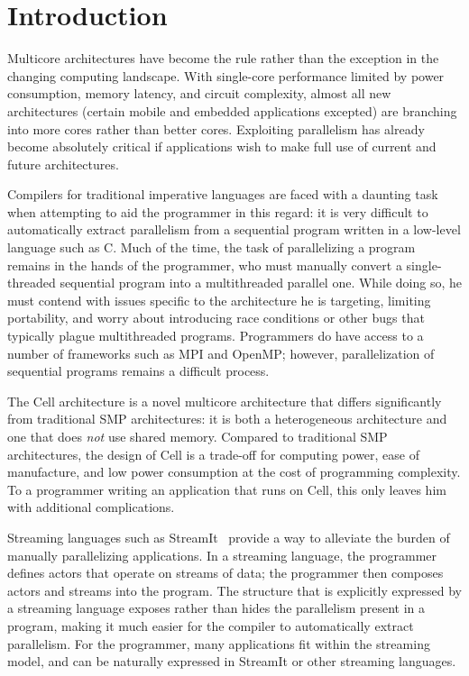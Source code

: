 \section{Introduction}

Multicore architectures have become the rule rather than the exception in the changing computing landscape. With single-core performance limited by power consumption, memory latency, and circuit complexity, almost all new architectures (certain mobile and embedded applications excepted) are branching into more cores rather than better cores. Exploiting parallelism has already become absolutely critical if applications wish to make full use of current and future architectures.

Compilers for traditional imperative languages are faced with a daunting task when attempting to aid the programmer in this regard: it is very difficult to automatically extract parallelism from a sequential program written in a low-level language such as C. Much of the time, the task of parallelizing a program remains in the hands of the programmer, who must manually convert a single-threaded sequential program into a multithreaded parallel one. While doing so, he must contend with issues specific to the architecture he is targeting, limiting portability, and worry about introducing race conditions or other bugs that typically plague multithreaded programs. Programmers do have access to a number of frameworks such as MPI and OpenMP; however, parallelization of sequential programs remains a difficult process.

The Cell architecture is a novel multicore architecture that differs significantly from traditional SMP architectures: it is both a heterogeneous architecture and one that does \emph{not} use shared memory. Compared to traditional SMP architectures, the design of Cell is a trade-off for computing power, ease of manufacture, and low power consumption at the cost of programming complexity. To a programmer writing an application that runs on Cell, this only leaves him with additional complications.

Streaming languages such as StreamIt~\cite{asplos02} provide a way to alleviate the burden of manually parallelizing applications. In a streaming language, the programmer defines actors that operate on streams of data; the programmer then composes actors and streams into the program. The structure that is explicitly expressed by a streaming language exposes rather than hides the parallelism present in a program, making it much easier for the compiler to automatically extract parallelism. For the programmer, many applications fit within the streaming model, and can be naturally expressed in StreamIt or other streaming languages.


